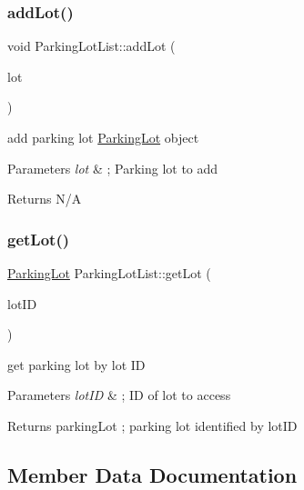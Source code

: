 \subsubsection{\texorpdfstring{add\+Lot()}{addLot()}}
{\footnotesize\ttfamily void Parking\+Lot\+List\+::add\+Lot (\begin{DoxyParamCaption}\item[{\mbox{\hyperlink{class_parking_lot}{Parking\+Lot}}}]{lot }\end{DoxyParamCaption})}



add parking lot \mbox{\hyperlink{class_parking_lot}{Parking\+Lot}} object 


\begin{DoxyParams}{Parameters}
{\em lot} & ; Parking lot to add \\
\hline
\end{DoxyParams}
\begin{DoxyReturn}{Returns}
N/A 
\end{DoxyReturn}
\mbox{\label{class_parking_lot_list_ae2b85aa157c306ebbac0c34dca35547b}} 
\subsubsection{\texorpdfstring{get\+Lot()}{getLot()}}
{\footnotesize\ttfamily \mbox{\hyperlink{class_parking_lot}{Parking\+Lot}} Parking\+Lot\+List\+::get\+Lot (\begin{DoxyParamCaption}\item[{int}]{lot\+ID }\end{DoxyParamCaption})}



get parking lot by lot ID 


\begin{DoxyParams}{Parameters}
{\em lot\+ID} & ; ID of lot to access \\
\hline
\end{DoxyParams}
\begin{DoxyReturn}{Returns}
parking\+Lot ; parking lot identified by lot\+ID 
\end{DoxyReturn}


\subsection{Member Data Documentation}
\mbox{\label{class_parking_lot_list_a6041b1720559ec708d78eeb6e9ffe314}} 
